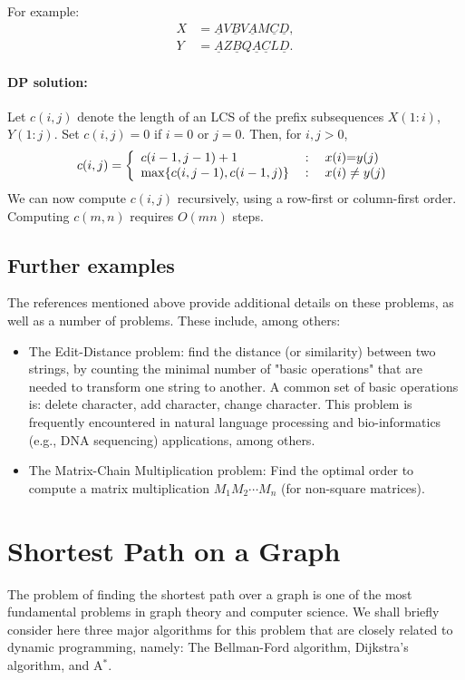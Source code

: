 For example:
\begin{equation*}
    \begin{split}
       X &= \underline{A}V\underline{B}V\underline{A}M\underline{C}\underline{D}, \\
       Y &= \underline{A}Z\underline{B}Q\underline{A}\underline{C}L\underline{D}.
     \end{split}
\end{equation*}
\paragraph{DP solution:}
Let  $c(i,j)$ denote the length of an LCS of  the prefix subsequences $X(1:i)$, $Y(1:j)$. Set $c(i,j) = 0$ if $i = 0$ or $j = 0$. Then, for $i,j > 0$,
\[c(i,j) = \left\{ {\begin{array}{*{20}{l}}
{c(i - 1,j - 1) + 1}&{\;:\quad x(i){\rm{ = }}y(j){\rm{  }}}\\
{\max \{ c(i,j - 1),c(i - 1,j)\} }&{\;:\quad x(i) \ne y(j)}
\end{array}} \right.\]
We can now compute $c(i,j)$  recursively, using a row-first or column-first order. Computing $c(m,n)$  requires $O(mn)$ steps.

\subsection{Further examples}
The references mentioned above provide additional details on these problems, as well as a number of problems. These include, among others:
\begin{itemize}
  \item The Edit-Distance problem: find the distance (or similarity) between two strings, by counting the minimal number of "basic operations" that are needed to transform one string to another. A common set of basic operations is: delete character, add character, change character. This problem is frequently encountered in natural language processing and bio-informatics (e.g., DNA sequencing) applications, among others.
  \item The Matrix-Chain Multiplication problem: Find the optimal order to compute a matrix multiplication  ${M_1}{M_2} \cdots {M_n}$  (for non-square matrices).
\end{itemize}

\section{Shortest Path on a Graph}
The problem of finding the shortest path over a graph is one of the most fundamental problems in graph theory and computer science. We shall briefly consider here three major algorithms for this problem that are closely related to dynamic programming, namely: The Bellman-Ford algorithm, Dijkstra's algorithm, and A$^*$.

